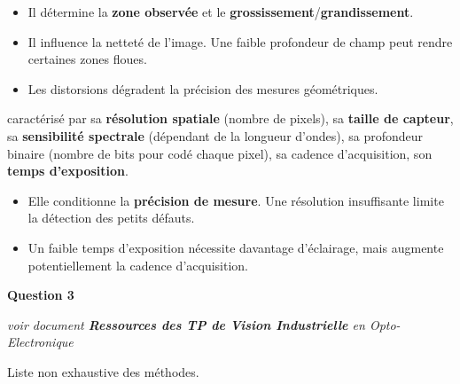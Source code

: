 \documentclass[a4paper,11pt,twoside]{book} %
\begin{document}
\begin{description}
	\begin{itemize}
		\item Il détermine la \textbf{zone observée} et le \textbf{grossissement}/\textbf{grandissement}.
		\item Il influence la netteté de l'image. Une faible profondeur de champ peut rendre certaines zones floues.
		\item Les distorsions dégradent la précision des mesures géométriques.
	\end{itemize}

	\item[Caméra] caractérisé par sa \textbf{résolution spatiale} (nombre de pixels), sa \textbf{taille de capteur}, sa \textbf{sensibilité spectrale} (dépendant de la longueur d'ondes), sa profondeur binaire (nombre de bits pour codé chaque pixel), sa cadence d'acquisition, son \textbf{temps d'exposition}.

	\begin{itemize}
		\item Elle conditionne la \textbf{précision de mesure}. Une résolution insuffisante limite la détection des petits défauts.
		\item Un faible temps d'exposition nécessite davantage d'éclairage, mais augmente potentiellement la cadence d'acquisition.
	\end{itemize}

\end{description}


\medskip
\textbf{Question 3}

\textit{voir document \textbf{Ressources des TP de Vision Industrielle} en Opto-Electronique}

Liste non exhaustive des méthodes.
\end{document}
